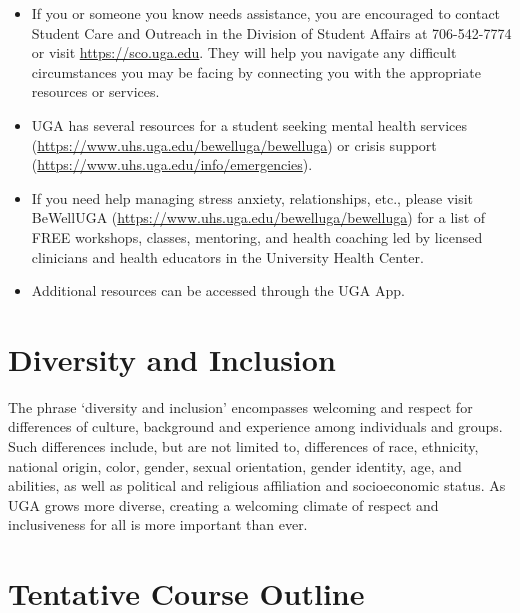 \documentclass[12pt]{article}
\begin{document}
\begin{itemize}
  \setlength\itemsep{-6pt}
  \item If you or someone you know needs assistance, you are
    encouraged to contact Student Care and Outreach in the Division of
    Student Affairs at 706-542-7774 or visit \url{https://sco.uga.edu}. They
    will help you navigate any difficult circumstances you may be facing
    by connecting you with the appropriate resources or services.
  \item UGA has several resources for a student seeking mental health
    services (\url{https://www.uhs.uga.edu/bewelluga/bewelluga}) or crisis
    support (\url{https://www.uhs.uga.edu/info/emergencies}).
  \item If you need help managing stress anxiety, relationships, etc.,
    please visit BeWellUGA (\url{https://www.uhs.uga.edu/bewelluga/bewelluga})
    for a list of FREE workshops, classes, mentoring, and health
    coaching led by licensed clinicians and health educators in the
    University Health Center.
  \item Additional resources can be accessed through the UGA App.
\end{itemize}


\vspace{-12pt}
\section*{\normalsize Diversity and Inclusion}
\vspace{-4mm}
The phrase ‘diversity and inclusion’ encompasses welcoming and respect
for differences of culture, background and experience among
individuals and groups. Such differences include, but are not limited
to, differences of race, ethnicity, national origin, color, gender,
sexual orientation, gender identity, age, and abilities, as well as
political and religious affiliation and socioeconomic status. As UGA
grows more diverse, creating a welcoming climate of respect and
inclusiveness for all is more important than ever. 



\clearpage

\section*{\normalsize Tentative Course Outline}
\end{document}

